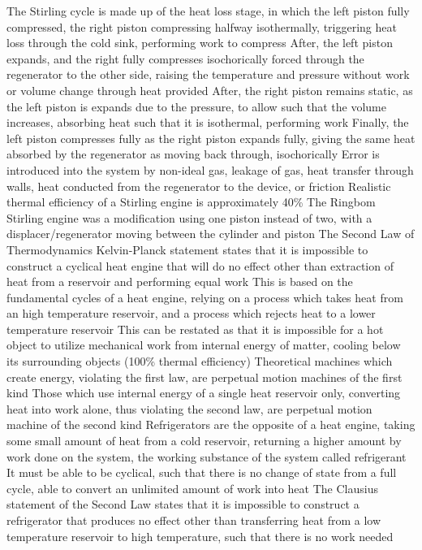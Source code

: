 \documentclass[11 pt, twoside]{article}
\newenvironment{outline*}
{
	\begin{outline}[enumerate]
	}
	{\end{outline}
}
\begin{document}
\begin{outline*}
\2 The Stirling cycle is made up of the heat loss stage, in which the left piston fully compressed, the right piston compressing halfway isothermally, triggering heat loss through the cold sink, performing work to compress
\3 After, the left piston expands, and the right fully compresses isochorically forced through the regenerator to the other side, raising the temperature and pressure without work or volume change through heat provided
\3 After, the right piston remains static, as the left piston is expands due to the pressure, to allow such that the volume increases, absorbing heat such that it is isothermal, performing work
\3 Finally, the left piston compresses fully as the right piston expands fully, giving the same heat absorbed by the regenerator as moving back through, isochorically
\2 Error is introduced into the system by non-ideal gas, leakage of gas, heat transfer through walls, heat conducted from the regenerator to the device, or friction
\3 Realistic thermal efficiency of a Stirling engine is approximately 40\%
\2 The Ringbom Stirling engine was a modification using one piston instead of two, with a displacer/regenerator moving between the cylinder and piston
\1 The Second Law of Thermodynamics Kelvin-Planck statement states that it is impossible to construct a cyclical heat engine that will do no effect other than extraction of heat from a reservoir and performing equal work
\2 This is based on the fundamental cycles of a heat engine, relying on a process which takes heat from an high temperature reservoir, and a process which rejects heat to a lower temperature reservoir
\3 This can be restated as that it is impossible for a hot object to utilize mechanical work from internal energy of matter, cooling below its surrounding objects (100\% thermal efficiency)
\2 Theoretical machines which create energy, violating the first law, are perpetual motion machines of the first kind
\2 Those which use internal energy of a single heat reservoir only, converting heat into work alone, thus violating the second law, are perpetual motion machine of the second kind
\1 Refrigerators are the opposite of a heat engine, taking some small amount of heat from a cold reservoir, returning a higher amount by work done on the system, the working substance of the system called refrigerant
\2 It must be able to be cyclical, such that there is no change of state from a full cycle, able to convert an unlimited amount of work into heat
\2 The Clausius statement of the Second Law states that it is impossible to construct a refrigerator that produces no effect other than transferring heat from a low temperature reservoir to high temperature, such that there is no work needed

\end{outline*}
\end{document}
